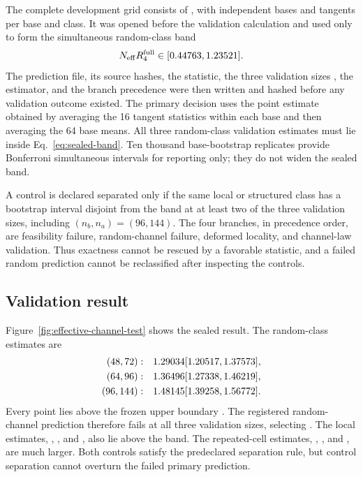 The complete development grid consists of \ChiralDevelopmentSizes{}, with \ChiralBasesPerSize{} independent bases and \ChiralTangentsPerBase{} tangents per base and class.  It was opened before the validation calculation and used only to form the simultaneous random-class band
\begin{equation}
 N_{\rm eff}R_4^{\mathrm{full}}\in
 [0.44763,1.23521].
 \label{eq:sealed-band}
\end{equation}
The prediction file, its source hashes, the statistic, the three validation sizes \ChiralValidationSizes{}, the estimator, and the branch precedence were then written and hashed before any validation outcome existed.  The primary decision uses the point estimate obtained by averaging the 16 tangent statistics within each base and then averaging the 64 base means.  All three random-class validation estimates must lie inside Eq.~\eqref{eq:sealed-band}.  Ten thousand base-bootstrap replicates provide Bonferroni simultaneous intervals for reporting only; they do not widen the sealed band.

A control is declared separated only if the same local or structured class has a bootstrap interval disjoint from the band at at least two of the three validation sizes, including $(n_b,n_a)=(96,144)$.  The four branches, in precedence order, are feasibility failure, random-channel failure, deformed locality, and channel-law validation.  Thus exactness cannot be rescued by a favorable statistic, and a failed random prediction cannot be reclassified after inspecting the controls.

\subsection{Validation result}

Figure~\ref{fig:effective-channel-test} shows the sealed result.  The random-class estimates are
\begin{align}
 (48,72):&\quad 1.29034
 [1.20517,1.37573],\nonumber\\
 (64,96):&\quad 1.36496
 [1.27338,1.46219],\nonumber\\
 (96,144):&\quad 1.48145
 [1.39258,1.56772].
 \label{eq:random-validation-values}
\end{align}
Every point lies above the frozen upper boundary \ChiralBandUpper.  The registered random-channel prediction therefore fails at all three validation sizes, selecting \PaperIIBranch.  The local estimates, \ChiralLocalOnePoint, \ChiralLocalTwoPoint, and \ChiralLocalThreePoint, also lie above the band.  The repeated-cell estimates, \ChiralStructuredOnePoint, \ChiralStructuredTwoPoint, and \ChiralStructuredThreePoint, are much larger.  Both controls satisfy the predeclared separation rule, but control separation cannot overturn the failed primary prediction.

